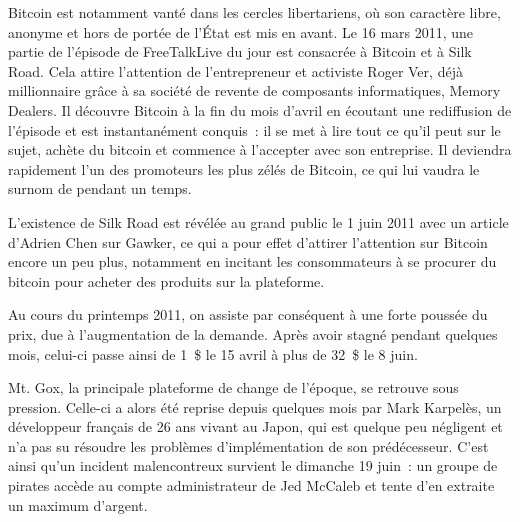 Bitcoin est notamment vanté dans les cercles libertariens, où son caractère libre, anonyme et hors de portée de l'État est mis en avant. Le 16 mars 2011, une partie de l'épisode de FreeTalkLive du jour est consacrée à Bitcoin et à Silk Road. Cela attire l'attention de l'entrepreneur et activiste Roger Ver, déjà millionnaire grâce à sa société de revente de composants informatiques, Memory Dealers. Il découvre Bitcoin à la fin du mois d'avril en écoutant une rediffusion de l'épisode et est instantanément conquis~: il se met à lire tout ce qu'il peut sur le sujet, achète du bitcoin et commence à l'accepter avec son entreprise. Il deviendra rapidement l'un des promoteurs les plus zélés de Bitcoin, ce qui lui vaudra le surnom de  pendant un temps.

L'existence de Silk Road est révélée au grand public le 1\ier{} juin 2011 avec un article d'Adrien Chen sur Gawker, ce qui a pour effet d'attirer l'attention sur Bitcoin encore un peu plus, notamment en incitant les consommateurs à se procurer du bitcoin pour acheter des produits sur la plateforme. %

\clearpage
Au cours du printemps 2011, on assiste par conséquent à une forte poussée du prix, due à l'augmentation de la demande. Après avoir stagné pendant quelques mois, celui-ci passe ainsi de 1~\$ le 15 avril à plus de 32~\$ le 8 juin.


Mt. Gox, la principale plateforme de change de l'époque, se retrouve sous pression. Celle-ci a alors été reprise depuis quelques mois par Mark Karpelès, un développeur français de 26 ans vivant au Japon, qui est quelque peu négligent et n'a pas su résoudre les problèmes d'implémentation de son prédécesseur. C'est ainsi qu'un incident malencontreux survient le dimanche 19 juin~: un groupe de pirates accède au compte administrateur de Jed McCaleb et tente d'en extraite un maximum d'argent.

